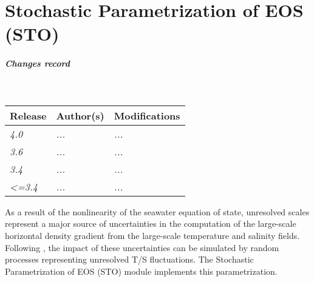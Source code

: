 \documentclass[../main/NEMO_manual]{subfiles}
\begin{document}
\chapter{Stochastic Parametrization of EOS (STO)}
\label{chap:STO}

\thispagestyle{plain}

\chaptertoc

\paragraph{Changes record} ~\\

{\footnotesize
  \begin{tabularx}{\textwidth}{l||X|X}
    Release & Author(s) & Modifications \\
    \hline
    {\em   4.0} & {\em ...} & {\em ...} \\
    {\em   3.6} & {\em ...} & {\em ...} \\
    {\em   3.4} & {\em ...} & {\em ...} \\
    {\em <=3.4} & {\em ...} & {\em ...}
  \end{tabularx}
}


\clearpage

As a result of the nonlinearity of the seawater equation of state, unresolved scales represent a major source of uncertainties in the computation of the large-scale horizontal density gradient from the large-scale temperature and salinity fields. Following  \cite{brankart_OM13}, the impact of these uncertainties can be simulated by random processes representing unresolved T/S fluctuations. The Stochastic Parametrization of EOS (STO) module implements this parametrization.
\end{document}
